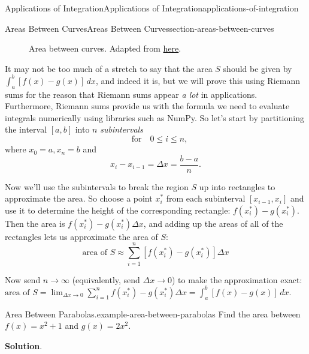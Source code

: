\documentclass[oneside,10pt,]{book}
\numberwithin{equation}{section}
\begin{document}
\begin{chapterptx}{Applications of Integration}{}{Applications of Integration}{}{}{applications-of-integration}
\begin{sectionptx}{Areas Between Curves}{}{Areas Between Curves}{}{}{section-areas-between-curves}
\begin{figure}
{
}
\caption{Area between curves. Adapted from \href{https://tex.stackexchange.com/questions/164773/graphics-area-between-curves}{here}.\label{figure-area-between-curves}}
\end{figure}
\hypertarget{p-614}{}%
It may not be too much of a stretch to say that the area \(S\) should be given by \(\int_{a}^{b}[f(x) - g(x)]\,dx\), and indeed it is, but we will prove this using Riemann sums for the reason that Riemann sums appear \emph{a lot} in applications. Furthermore, Riemann sums provide us with the formula we need to evaluate integrals numerically using libraries such as NumPy. So let's start by partitioning the interval \([a,b]\) into \(n\) \emph{subintervals}%
\begin{equation*}
[x_{i-1},x_{i}]\quad\text{for}\quad 0\leq i\leq n,
\end{equation*}
where \(x_{0} = a, x_{n} = b\) and%
\begin{equation*}
x_{i} - x_{i-1} = \Delta x = \frac{b-a}{n}.
\end{equation*}
%
\par
\hypertarget{p-615}{}%
Now we'll use the subintervals to break the region \(S\) up into rectangles to approximate the area. So choose a point \(x_{i}^{*}\) from each subinterval \([x_{i-1}, x_{i}]\) and use it to determine the height of the corresponding rectangle: \(f(x_{i}^{*}) - g(x_{i}^{*})\). Then the area is \(f(x_{i}^{*}) - g(x_{i}^{*})\Delta x\), and adding up the areas of all of the rectangles lets us approximate the area of \(S\):%
\begin{equation}
\text{area of }S \approx \sum_{i=1}^{n}[f(x_{i}^{*}) - g(x_{i}^{*})]\Delta x\label{equation-area-between-curves-approximation}
\end{equation}
%
\par
\hypertarget{p-616}{}%
Now send \(n\to\infty\) (equivalently, send \(\Delta x\to 0\)) to make the approximation exact: \(\text{area of }S = \lim_{\Delta x\to0}\sum_{i=1}^{n}f(x_{i}^{*}) - g(x_{i}^{*})\Delta x = \int_{a}^{b}[f(x) - g(x)]\,dx.\)%
\begin{example}{Area Between Parabolas.}{example-area-between-parabolas}%
\hypertarget{p-617}{}%
Find the area between \(f(x) = x^{2} + 1\) and \(g(x) = 2x^{2}\).%
\par\smallskip%
\noindent\textbf{Solution}.\hypertarget{solution-134}{}\quad%

\end{example}
\end{sectionptx}
\end{chapterptx}
\end{document}
